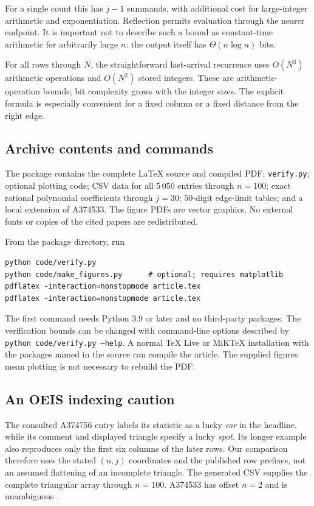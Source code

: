 \documentclass[11pt,letterpaper]{article}
\numberwithin{equation}{section}
\theoremstyle{definition}
\begin{document}
For a single count this has $j-1$ summands, with additional cost for
large-integer arithmetic and exponentiation. Reflection permits evaluation
through the nearer endpoint. It is important not to describe such a bound
as constant-time arithmetic for arbitrarily large $n$: the output itself
has $\Theta(n\log n)$ bits.

For all rows through $N$, the straightforward last-arrival recurrence uses
$O(N^3)$ arithmetic operations and $O(N^2)$ stored integers. These are
arithmetic-operation bounds; bit complexity grows with the integer sizes.
The explicit formula is especially convenient for a fixed column or a fixed
distance from the right edge.

\subsection{Archive contents and commands}
The package contains the complete \LaTeX{} source and compiled PDF;
\texttt{verify.py}; optional plotting code; CSV data for all
$5\,050$ entries through $n=100$; exact rational polynomial coefficients
through $j=30$; 50-digit edge-limit tables; and a local extension of A374533.
The figure PDFs are vector graphics. No external fonts or copies of the
cited papers are redistributed.

From the package directory, run
\begin{lstlisting}
python code/verify.py
python code/make_figures.py      # optional; requires matplotlib
pdflatex -interaction=nonstopmode article.tex
pdflatex -interaction=nonstopmode article.tex
\end{lstlisting}
The first command needs Python 3.9 or later and no third-party packages.
The verification bounds can be changed with command-line options described
by \texttt{python code/verify.py --help}. A normal \TeX{} Live or MiK\TeX{}
installation with the packages named in the source can compile the article.
The supplied figures mean plotting is not necessary to rebuild the PDF.

\subsection{An OEIS indexing caution}
The consulted A374756 entry labels its statistic as a lucky \emph{car} in
the headline, while its comment and displayed triangle specify a lucky
\emph{spot}. Its longer example also reproduces only the first six columns
of the later rows. Our comparison therefore uses the stated $(n,j)$
coordinates and the published row prefixes, not an assumed flattening of
an incomplete triangle. The generated CSV supplies the complete triangular
array through $n=100$. A374533 has offset $n=2$ and is unambiguous
\cite{oeis-triangle,oeis-next}.
\end{document}

